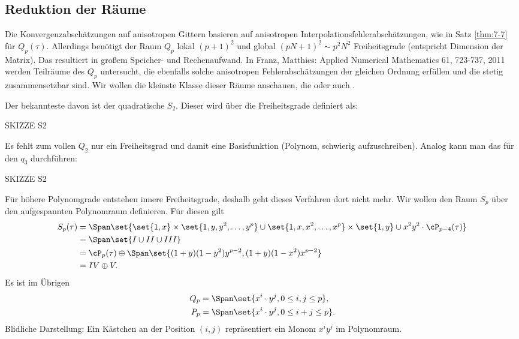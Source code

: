 \subsection{Reduktion der Räume}
\label{sec:reduktion-der-raume}

Die Konvergenzabschätzungen auf anisotropen Gittern basieren auf anisotropen Interpolationsfehlerabschätzungen, wie in Satz \ref{thm:7-7} für $Q_{p}(\tau)$. Allerdings benötigt der Raum $Q_{p}$ lokal $(p+1)^{2}$ und global $(pN+1)^{2} \sim p^{2} N^{2}$ Freiheitsgrade (entspricht Dimension der Matrix). Das resultiert in großem Speicher- und Rechenaufwand. In Franz, Matthies: Applied Numerical Mathematics 61, 723-737, 2011 werden Teilräume des $Q_{p}$ untersucht, die ebenfalls solche anisotropen Fehlerabschätzungen der gleichen Ordnung erfüllen und die stetig zusammensetzbar sind. Wir wollen die kleinste Klasse dieser Räume anschauen, die  oder auch . 

Der bekannteste davon ist der quadratische $S_{2}$. Dieser wird über die Freiheitsgrade definiert als:   

SKIZZE S2

Es fehlt zum vollen $Q_{2}$ nur ein Freiheitsgrad und damit eine Basisfunktion (Polynom, schwierig aufzuschreiben). Analog kann man das für den $q_{3}$ durchführen:

SKIZZE S2

Für höhere Polynomgrade entstehen innere Freiheitsgrade, deshalb geht dieses Verfahren dort nicht mehr. Wir wollen den Raum $S_{p}$ über den aufgespannten Polynomraum definieren. Für diesen gilt
\begin{align*}
  S_{p}(\tau) &= \Span\set{ \set{1, x} \times \set{1, y, y^{2}, \dots, y^{p}} \cup \set{1, x, x^{2}, \dots, x^{p}} \times \set{1, y} \cup x^{2}y^{2} \cdot\cP_{p-4}(\tau)}\\
&= \Span\set{I \cup II \cup III}\\
&= \cP_{p}(\tau) \oplus \Span \set{(1+y)(1-y^{2})y^{p-2}, (1+y)(1-x^{2})x^{p-2}} \\
&= IV \oplus V.
\end{align*}
Es ist im Übrigen
\begin{align*}
  Q_{p} &= \Span \set{x^{i}\cdot y^{j}, 0 \leq i, j \leq p},\\
  P_{p} &= \Span \set{x^{i}\cdot y^{j}, 0 \leq i + j \leq p}. 
\end{align*}
Blidliche Darstellung: Ein Kästchen an der Position $(i, j)$ repräsentiert ein Monom $x^{i}y^{j}$ im Polynomraum. 

